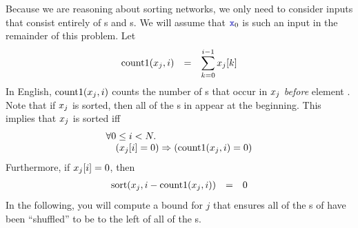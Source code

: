 \documentclass{article}
\begin{document}
\begin{enumerate}
          Because we are reasoning about sorting networks, we only need to consider inputs
          that consist entirely of s and s.
          We will assume that $\code{x}_0$ is such an input in the remainder of this problem.
          Let
          \begin{displaymath}\begin{array}{rcl}
                  \mathrm{count1}(x_{j}, i) & = & \displaystyle \sum_{k=0}^{i-1} x_{j}[k]
              \end{array}\end{displaymath}
          In English, $\mathrm{count1}(x_{j}, i)$ counts the number of s
          that occur in $x_{j}$ \emph{before} element .
          Note that if $x_{j}$ is sorted, then all of the s in  appear at the beginning.
          This implies that $x_{j}$ is sorted iff
          \begin{displaymath}\begin{array}{ll}
                  \multicolumn{2}{l}{\forall 0 \leq i < N.}                        \\
                   & (\xji{j}{i} = 0) \Rightarrow (\mathrm{count1}(\xj{j}, i) = 0)
              \end{array}\end{displaymath}
          Furthermore, if $x_{j}[i] = 0$, then
          \begin{displaymath}\begin{array}{rcl}
                  \mathrm{sort}(x_{j}, i - \mathrm{count1}(x_{j},i)) & = & 0
              \end{array}\end{displaymath}
          In the following, you will compute a bound for $j$ that ensures all of the s of 
          have been ``shuffled'' to be to the left of all of the s.


\end{enumerate}
\end{document}
